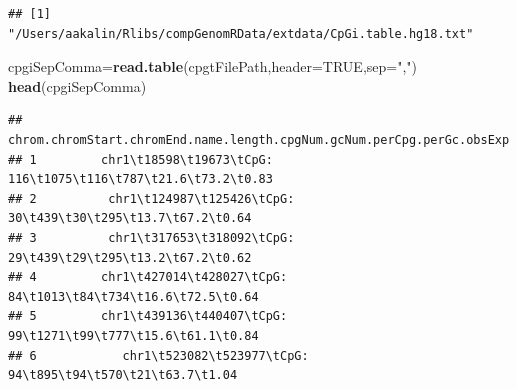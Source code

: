 \documentclass[12pt,]{krantz}
\newenvironment{Shaded}{\begin{snugshade}}{\end{snugshade}}
\newcommand{\DataTypeTok}[1]{\textcolor[rgb]{0.13,0.29,0.53}{#1}}
\newcommand{\KeywordTok}[1]{\textcolor[rgb]{0.13,0.29,0.53}{\textbf{#1}}}
\newcommand{\NormalTok}[1]{#1}
\newcommand{\OtherTok}[1]{\textcolor[rgb]{0.56,0.35,0.01}{#1}}
\newcommand{\StringTok}[1]{\textcolor[rgb]{0.31,0.60,0.02}{#1}}
\theoremstyle{definition}
\theoremstyle{definition}
\theoremstyle{definition}
\theoremstyle{remark}
\begin{document}
\begin{verbatim}
## [1] "/Users/aakalin/Rlibs/compGenomRData/extdata/CpGi.table.hg18.txt"
\end{verbatim}

\begin{Shaded}
\begin{Highlighting}[]
\NormalTok{cpgiSepComma=}\KeywordTok{read.table}\NormalTok{(cpgtFilePath,}\DataTypeTok{header=}\OtherTok{TRUE}\NormalTok{,}\DataTypeTok{sep=}\StringTok{","}\NormalTok{)}
\KeywordTok{head}\NormalTok{(cpgiSepComma)}
\end{Highlighting}
\end{Shaded}

\begin{verbatim}
##   chrom.chromStart.chromEnd.name.length.cpgNum.gcNum.perCpg.perGc.obsExp
## 1         chr1\t18598\t19673\tCpG: 116\t1075\t116\t787\t21.6\t73.2\t0.83
## 2          chr1\t124987\t125426\tCpG: 30\t439\t30\t295\t13.7\t67.2\t0.64
## 3          chr1\t317653\t318092\tCpG: 29\t439\t29\t295\t13.2\t67.2\t0.62
## 4         chr1\t427014\t428027\tCpG: 84\t1013\t84\t734\t16.6\t72.5\t0.64
## 5         chr1\t439136\t440407\tCpG: 99\t1271\t99\t777\t15.6\t61.1\t0.84
## 6            chr1\t523082\t523977\tCpG: 94\t895\t94\t570\t21\t63.7\t1.04
\end{verbatim}
\end{document}
